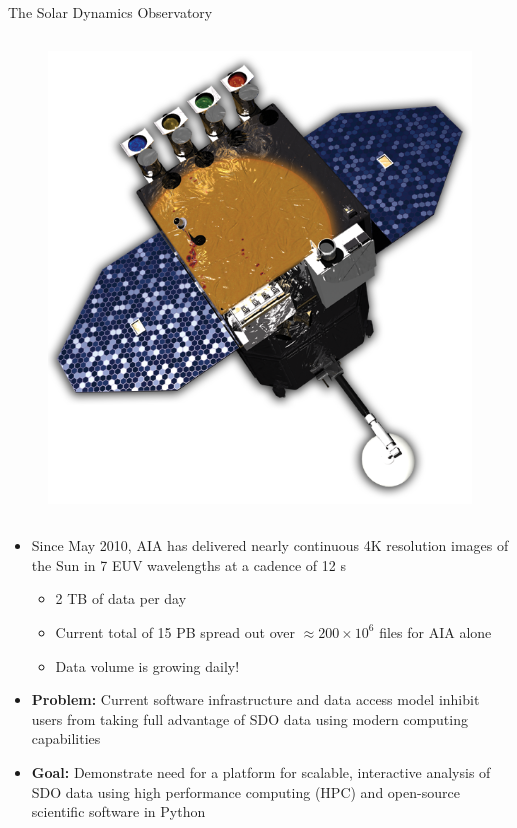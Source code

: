 \documentclass[final,12pt]{beamer}
\newlength{\colwidth}
\begin{document}
\begin{frame}[fragile,t]
\begin{columns}[T]
\begin{column}{\colwidth}
\begin{block}{The Solar Dynamics Observatory}
\begin{columns}
\begin{column}{0.3\columnwidth}
\begin{figure}
          \includegraphics[width=\columnwidth]{figures/sdo.png}
        \end{figure}
      \end{column}
    \end{columns}
    \begin{itemize}
      \item Since May 2010, AIA has delivered nearly continuous \alert{4K resolution} images of the Sun in \alert{7 EUV wavelengths} at a \alert{cadence of 12 s}
      \begin{itemize}
        \item \alert{2 TB of data per day}
        \item Current \alert{total of 15 PB} spread out over \alert{$\approx200\times10^6$ files} for AIA alone
        \item Data volume is growing daily!
      \end{itemize}
      \item \alert{\textbf{Problem:}} Current software infrastructure and data access model inhibit users from taking full advantage of SDO data using modern computing capabilities
      \item \alert{\textbf{Goal:}} Demonstrate need for a platform for \alert{scalable, interactive analysis of SDO data} using high performance computing (HPC) and open-source scientific software in Python
    \end{itemize}
  \end{block}


\end{column}
\end{columns}
\end{frame}
\end{document}
